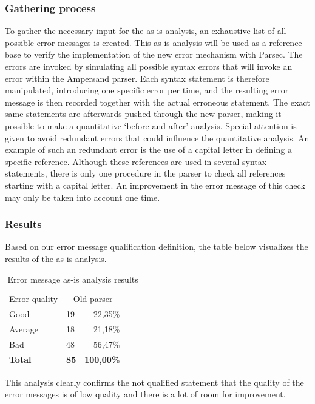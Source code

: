 \subsubsection{Gathering process}

To gather the necessary input for the as-is analysis, an exhaustive list of all possible error messages is created.
This as-is analysis will be used as a reference base to verify the implementation of the new error mechanism with Parsec.
The errors are invoked by simulating all possible syntax errors that will invoke an error within the Ampersand parser.
Each syntax statement is therefore manipulated, introducing one specific error per time, and the resulting error message is then recorded together with the actual erroneous statement.
The exact same statements are afterwards pushed through the new parser, making it possible to make a quantitative `before and after' analysis.
Special attention is given to avoid redundant errors that could influence the quantitative analysis. 
An example of such an redundant error is the use of a capital letter in defining a specific reference. 
Although these references are used in several syntax statements, there is only one procedure in the parser to check all references starting with a capital letter.
An improvement in the error message of this check may only be taken into account one time.

\subsubsection{Results}
Based on our error message qualification definition, the table below visualizes the results of the as-is analysis.

\begin{table}[h]
  \centering
	\begin{tabular}{llrlr}
    Error quality  & \multicolumn{2}{c}{Old parser}     \\
		Good           & 19          & 22,35\%         \\
		Average        & 18          & 21,18\%       \\
		Bad            & 48          & 56,47\%           \\
		\rowcolor[HTML]{BBBBBB}
		\textbf{Total} & \textbf{85} & \textbf{100,00\%} 
	\end{tabular}
  \caption{Error message as-is analysis results}
  \label{tab:error-messages-as-is-analysis-results}
\end{table}

This analysis clearly confirms the not qualified statement that the quality of the error messages is of low quality and there is a lot of room for improvement.
